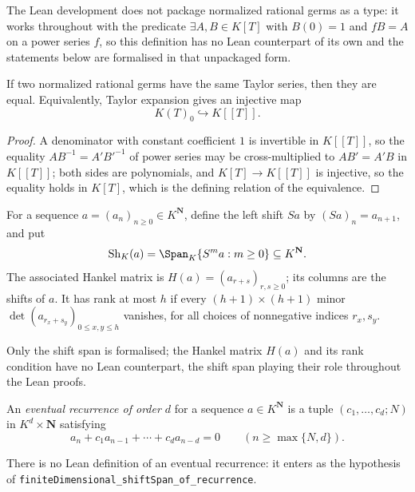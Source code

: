 The Lean development does not package normalized rational germs as a type:
it works throughout with the predicate $\exists A,B\in K[T]$ with $B(0)=1$
and $fB=A$ on a power series $f$, so this definition has no Lean counterpart
of its own and the statements below are formalised in that unpackaged form.

\begin{lemma}
\label{lem:zla-taylor-faithful}
\leanok
If two normalized rational germs have the same Taylor series, then they are
equal.  Equivalently, Taylor expansion gives an injective map
\[
  K(T)_0\hookrightarrow K[[T]].
\]
\end{lemma}
\begin{proof}
\leanok
A denominator with constant coefficient $1$ is invertible in $K[[T]]$, so the
equality $AB^{-1}=A'B'^{-1}$ of power series may be cross-multiplied to
$AB'=A'B$ in $K[[T]]$; both sides are polynomials, and $K[T]\to K[[T]]$ is
injective, so the equality holds in $K[T]$, which is the defining relation of
the equivalence.
\end{proof}

\begin{definition}
\label{def:zla-shift-span}
For a sequence $a=(a_n)_{n\geq0}\in K^{\mathbf N}$, define the left shift $Sa$
by $(Sa)_n=a_{n+1}$, and put
\[
  \operatorname{Sh}_K(a)=\Span_K\{S^ma:m\geq0\}\subseteq K^{\mathbf N}.
\]
The associated Hankel matrix is $H(a)=(a_{r+s})_{r,s\geq0}$; its columns are
the shifts of $a$.  It has rank at most $h$ if every $(h+1)\times(h+1)$ minor
$\det(a_{r_x+s_y})_{0\leq x,y\leq h}$ vanishes, for all choices of nonnegative
indices $r_x,s_y$.
\end{definition}

Only the shift span is formalised; the Hankel matrix $H(a)$ and its rank
condition have no Lean counterpart, the shift span playing their role
throughout the Lean proofs.

\begin{definition}
\label{def:zla-eventual-recurrence}
An \emph{eventual recurrence of order $d$} for a sequence
$a\in K^{\mathbf N}$ is a tuple $(c_1,\ldots,c_d;N)$ in
$K^d\times\mathbf N$ satisfying
\[
  a_n+c_1a_{n-1}+\cdots+c_da_{n-d}=0
  \qquad(n\geq\max\{N,d\}).
\]
\end{definition}

There is no Lean definition of an eventual recurrence: it enters as the
hypothesis of \texttt{finiteDimensional\_shiftSpan\_of\_recurrence}.

